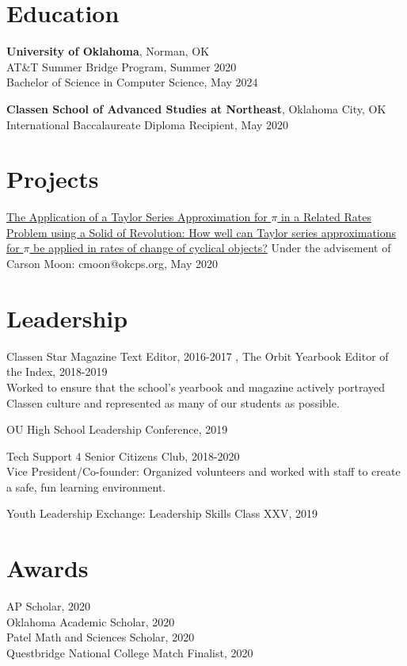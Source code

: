 \documentclass[12pt]{article}
\begin{document}
\section*{Education}
\textbf{University of Oklahoma}, Norman, OK \\
AT\&T Summer Bridge Program, Summer 2020 \\
Bachelor of Science in Computer Science, May 2024

\textbf{Classen School of Advanced Studies at Northeast}, Oklahoma City, OK \\
International Baccalaureate Diploma Recipient, May 2020

\section*{Projects}
\href{https://github.com/tttnguyen729/ee}{The Application of a Taylor Series Approximation for \(\pi\) in a Related Rates Problem using a Solid of Revolution: How well can Taylor series approximations for \(\pi\) be applied in rates of change of cyclical objects?} Under the advisement of Carson Moon: cmoon@okcps.org, May 2020 

\section*{Leadership}
Classen Star Magazine Text Editor, 2016-2017 , The Orbit Yearbook Editor of the Index, 2018-2019 \\
Worked to ensure that the school's yearbook and magazine actively portrayed Classen culture and represented as many of our students as possible.

OU High School Leadership Conference, 2019

Tech Support 4 Senior Citizens Club, 2018-2020 \\
Vice President/Co-founder: Organized volunteers and worked with staff to create a safe, fun learning environment.

Youth Leadership Exchange: Leadership Skills Class XXV, 2019 

\section*{Awards}
AP Scholar, 2020 \\
Oklahoma Academic Scholar, 2020 \\
Patel Math and Sciences Scholar, 2020 \\
Questbridge National College Match Finalist, 2020 
\end{document}
